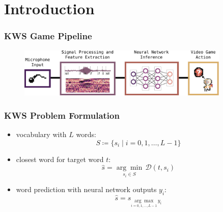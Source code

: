 
\section{Introduction}

\begin{frame}
  \frametitle{KWS Game Pipeline}
  \vfill
  \begin{figure} \includegraphics[width=0.9\textwidth]{../1_intro/figs/intro_kws.pdf} \end{figure}
  \scriptsize
  \vspace{0.3cm}
  \centering
\end{frame}

\begin{frame}
  \frametitle{KWS Problem Formulation}
  \begin{itemize}
    \item vocabulary with $L$ words:
    \begin{equation*}\label{eq:intro_kws_dict}
      S \coloneqq \{s_i \mid i = 0, 1, \dots, L - 1\}
    \end{equation*}
    \item closest word for target word $t$:
    \begin{equation*}\label{eq:intro_kws_task}
      \hat{s} = \underset{s_i \in S}{\arg \min} \, \mathcal{D}(t, s_i)
    \end{equation*}
    \item word prediction with neural network outputs $y_i$:
    \begin{equation*}\label{eq:intro_kws_class}
      \hat{s} = s_{\underset{i = 0, 1, \dots, L - 1}{\arg \max} \, y_i}
    \end{equation*}
  \end{itemize}
\end{frame}
